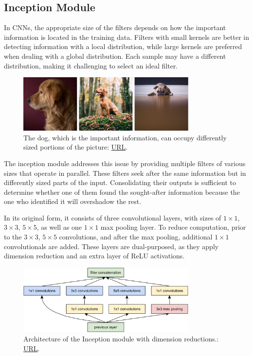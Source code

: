 \subsection{Inception Module}\label{Inception Module}
In CNNs, the appropriate size of the filters depends on how the important information is located in the training data. Filters with small kernels are better in detecting information with a local distribution, while large kernels are preferred when dealing with a global distribution. Each sample may have a different distribution, making it challenging to select an ideal filter.
\begin{figure}[H]
    \centering
        \includegraphics[width=0.8\textwidth]{Images/dogs_inception.jpg}
        \decoRule
        \caption[Variety of distribution of information.]{The dog, which is the important information, can occupy differently sized portions of the picture: \href{https://towardsdatascience.com/a-simple-guide-to-the-versions-of-the-inception-network-7fc52b863202}{URL}.}
        \label{fig:dogs_inception}
\end{figure}

The inception module \cite{inception_module} addresses this issue by providing multiple filters of various sizes that operate in parallel. These filters seek after the same information but in differently sized parts of the input. Consolidating their outputs is sufficient to determine whether one of them found the sought-after information because the one who identified it will overshadow the rest.

In its original form, it consists of three convolutional layers, with sizes of \(1\times1\), \(3\times3\), \(5\times5\), as well as one \(1\times1\) max pooling layer. To reduce computation, prior to the \(3\times3\), \(5\times5\) convolutions, and after the max pooling, additional \(1\times1\) convolutionals are added. These layers are dual-purposed, as they apply dimension reduction and an extra layer of ReLU activations.

\begin{figure}[H]
    \centering
        \includegraphics[width=0.8\textwidth]{Images/ANNArchitectures/inception_module.png}
        \decoRule
        \caption[Inception Module]{Architecture of the Inception module with dimension reductions.: \href{https://arxiv.org/abs/1409.4842}{URL}.}
        \label{fig:inception}
\end{figure}

